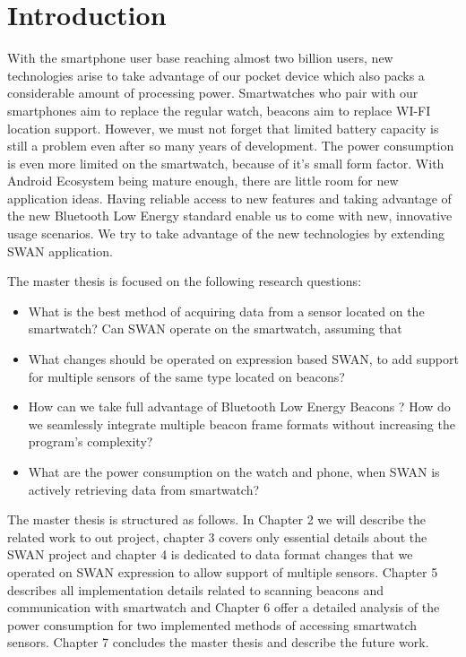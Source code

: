 
\chapter{Introduction} %

\label{Chapter1} %


With the smartphone user base reaching almost two billion users, new technologies arise to take advantage of our pocket device which also packs a considerable amount of processing power.
Smartwatches who pair with our smartphones aim to replace the regular watch, beacons aim to replace WI-FI location support. 
However, we must not forget that limited battery capacity is still a problem even after so many years of development. The power consumption is even more limited on the smartwatch, because of
it's small form factor.
With Android Ecosystem being mature enough, there are little room for new application ideas. Having reliable access to new features and taking advantage of the new Bluetooth Low Energy standard
enable us to come with new, innovative usage scenarios. We try to take advantage of the new technologies by extending SWAN application.

The master thesis is focused on the following research questions:

\begin{itemize}
 \item What is the best method of acquiring data from a sensor located on the smartwatch? Can SWAN operate on the smartwatch, assuming that 
 \item What changes should be operated on expression based SWAN, to add support for multiple sensors of the same type located on beacons?
 \item How can we take full advantage of Bluetooth Low Energy Beacons ? How do we seamlessly integrate multiple beacon frame formats without increasing the program's complexity?
 \item What are the power consumption on the watch and phone, when SWAN is actively retrieving data from smartwatch?
\end{itemize}

The master thesis is structured as follows. In Chapter 2 we will describe the related work to out project, chapter 3 covers only essential details about the SWAN project and chapter 4 is dedicated to 
data format changes that we operated on SWAN expression to allow support of multiple sensors. Chapter 5 describes all implementation details related to scanning beacons and communication
with smartwatch and Chapter 6 offer a detailed analysis of the power consumption for two implemented methods of accessing smartwatch sensors. Chapter 7 concludes the master thesis and describe 
the future work.
